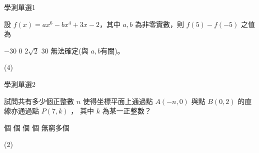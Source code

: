     \begin{QUESTION}
        \begin{ExamInfo}{96}{學測}{單選}{1}
        \end{ExamInfo}
        \begin{ExamAnsRateInfo}{71}{95}{81}{37}
        \end{ExamAnsRateInfo}
        \begin{QBODY}
            設 $f(x)=ax^6 -bx^4 +3x- 2$，其中 $a,b$ 為非零實數，則 $f(5)- f(-5)$ 之值為 
		\begin{QOPS} 
			\QOP $-30$        
			\QOP $0$        
			\QOP $2\sqrt{2}$ 
			\QOP $30$ 
			\QOP 無法確定(與 $a,b$有關)。
		\end{QOPS}
        \end{QBODY}
        \begin{QFROMS}
        \end{QFROMS}
        \begin{QTAGS}\end{QTAGS}
        \begin{QANS}
            (4)
        \end{QANS}
        \begin{QSOLLIST}
        \end{QSOLLIST}
        \begin{QEMPTYSPACE}
        \end{QEMPTYSPACE}
    \end{QUESTION}
    \begin{QUESTION}
        \begin{ExamInfo}{96}{學測}{單選}{2}
        \end{ExamInfo}
        \begin{ExamAnsRateInfo}{35}{58}{28}{19}
        \end{ExamAnsRateInfo}
        \begin{QBODY}
            試問共有多少個正整數 $n$ 使得坐標平面上通過點 $A(-n, 0)$ 與點 $B(0, 2)$ 的直線亦通過點 $P(7, k)$ ， 其中 $k$ 為某一正整數？
			\begin{QOPS} 
				\QOP 2 個 
				\QOP 4 個 
				\QOP 6 個 
				\QOP 8 個 
				\QOP 無窮多個
			\end{QOPS}
        \end{QBODY}
        \begin{QFROMS}
        \end{QFROMS}
        \begin{QTAGS}\end{QTAGS}
        \begin{QANS}
            (2)
        \end{QANS}
        \begin{QSOLLIST}
        \end{QSOLLIST}
        \begin{QEMPTYSPACE}
        \end{QEMPTYSPACE}
    \end{QUESTION}
